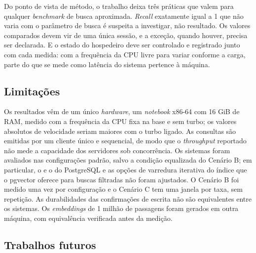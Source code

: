 Do ponto de vista de método, o trabalho deixa três práticas que valem para qualquer \textit{benchmark} de busca aproximada. \textit{Recall} exatamente igual a 1 que não varia com o parâmetro de busca é suspeita a investigar, não resultado. Os valores comparados devem vir de uma única sessão, e a exceção, quando houver, precisa ser declarada. E o estado do hospedeiro deve ser controlado e registrado junto com cada medida: com a frequência da CPU livre para variar conforme a carga, parte do que se mede como latência do sistema pertence à máquina.

\subsection{Limitações}

Os resultados vêm de um único \textit{hardware}, um \textit{notebook} x86-64 com 16 GiB de RAM, medido com a frequência da CPU fixa na base e sem turbo; os valores absolutos de velocidade seriam maiores com o turbo ligado. As consultas são emitidas por um cliente único e sequencial, de modo que o \textit{throughput} reportado não mede a capacidade dos servidores sob concorrência. Os sistemas foram avaliados nas configurações padrão, salvo a condição equalizada do Cenário B; em particular, o  e o  do PostgreSQL e as opções de varredura iterativa do índice que o pgvector oferece para buscas filtradas não foram ajustados. O Cenário B foi medido uma vez por configuração e o Cenário C tem uma janela por taxa, sem repetição. As durabilidades das confirmações de escrita não são equivalentes entre os sistemas. Os \textit{embeddings} de 1 milhão de passagens foram gerados em outra máquina, com equivalência verificada antes da medição.

\subsection{Trabalhos futuros}
\label{sec:futuros}

